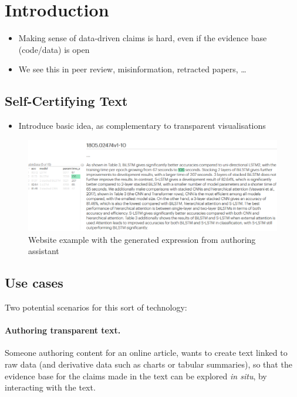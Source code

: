 \section{Introduction}

\begin{itemize}
    \item Making sense of data-driven claims is hard, even if the evidence base (code/data) is open
    \item We see this in peer review, misinformation, retracted papers, …
\end{itemize}

\subsection{Self-Certifying Text}

\begin{itemize}
    \item Introduce basic idea, as complementary to transparent visualisations
\end{itemize}

\begin{figure}
    \centering
    \includegraphics[width=\linewidth]{fig/scigen-mr-1906.02780-10.png}
    \caption{Website example with the generated expression from authoring assistant}\label{fig:scigen-example-website}
\end{figure}


\subsection{Use cases}
Two potential scenarios for this sort of technology:

\paragraph{Authoring transparent text.} Someone authoring content for an online article, wants to create text
linked to raw data (and derivative data such as charts or tabular summaries), so that the evidence base for
the claims made in the text can be explored \emph{in situ}, by interacting with the text.

